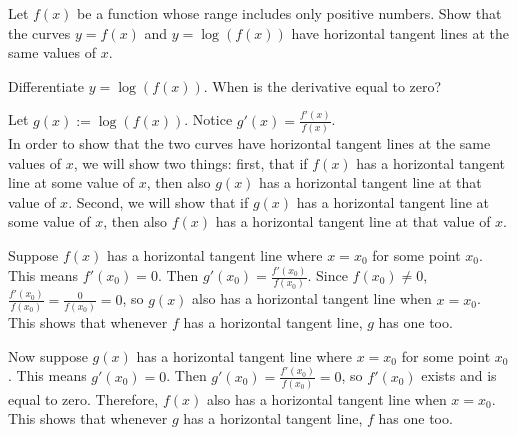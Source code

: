 \begin{Mquestion}
Let $f(x)$ be a function whose range includes only positive numbers. Show that the curves $y=f(x)$ and $y=\log(f(x))$ have horizontal tangent lines at the same values of $x$.
\end{Mquestion}
\begin{hint}
Differentiate $y=\log(f(x))$. When is the derivative equal to zero?
\end{hint}
\begin{answer}
Let $g(x):=\log(f(x))$. Notice $g'(x)=\frac{f'(x)}{f(x)}$.\\

In order to show that the two curves have horizontal tangent lines at the same values of $x$, we will show two things: first, that if $f(x)$ has a horizontal tangent line at some
value of $x$, then also $g(x)$ has a horizontal tangent line at that value of $x$.
Second, we will show that if $g(x)$ has a horizontal tangent line at some
value of $x$, then also $f(x)$ has a horizontal tangent line at that value of $x$.

Suppose $f(x)$ has a horizontal tangent line where $x=x_0$ for some point $x_0$. This means $f'(x_0)=0$. Then $g'(x_0)=\frac{f'(x_0)}{f(x_0)}$. Since $f(x_0) \neq 0$, $\frac{f'(x_0)}{f(x_0)}=\frac{0}{f(x_0)}=0$, so $g(x)$ also has a horizontal tangent line when $x=x_0$. This shows that whenever $f$ has a horizontal tangent line, $g$ has one too.

Now suppose $g(x)$ has a horizontal tangent line where $x=x_0$ for some point $x_0$. This means $g'(x_0)=0$. Then $g'(x_0)=\frac{f'(x_0)}{f(x_0)}=0$,
so $f'(x_0)$ exists and is equal to zero.
Therefore, $f(x)$ also has a horizontal tangent line when $x=x_0$. This shows that whenever $g$ has a horizontal tangent line, $f$ has one too.
\end{answer}

